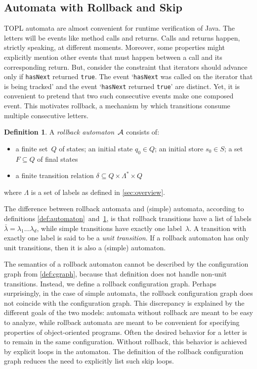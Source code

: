 \documentclass[9pt, preprint]{sigplanconf} %
\theoremstyle{definition}
\newtheorem{definition}{Definition}
\theoremstyle{remark}
\begin{document}
\subsection{Automata with Rollback and Skip} %

TOPL automata are almost convenient for runtime verification of Java.
The letters will be events like method calls and returns.
Calls and returns happen, strictly speaking, at different moments.
Moreover, some properties might explicitly mention other events that must happen between a call and its corresponding return.
But, consider the constraint that iterators should advance only if {\tt hasNext} returned {\tt true}.
The event `{\tt hasNext} was called on the iterator that is being tracked' and the event `{\tt hasNext} returned {\tt true}' are distinct.
Yet, it is convenient to pretend that two such consecutive events make one composed event.
This motivates rollback, a mechanism by which transitions consume multiple consecutive letters.

\begin{definition}\label{def:rollback}
A \emph{rollback automaton}~${\cal A}$ consists of:
\begin{itemize}
\item a finite set~$Q$ of states; an initial state $q_0\in Q$; an initial store $s_0\in S$; a set $F\subseteq Q$ of final states
\item a finite transition relation $\delta\subseteq Q\times\Lambda^*\times Q$
\end{itemize}
where $\Lambda$ is a set of labels as defined in \autoref{sec:overview}.
\end{definition}

The difference between rollback automata and (simple) automata, according to definitions \ref{def:automaton}~and~\ref{def:rollback}, is that rollback transitions have a list of labels $\bar\lambda=\lambda_1\ldots\lambda_d$, while simple transitions have exactly one label~$\lambda$.
A transition with exactly one label is said to be a \emph{unit transition}.
If a rollback automaton has only unit transitions, then it is also a (simple) automaton.

The semantics of a rollback automaton cannot be described by the configuration graph from \autoref{def:cgraph}, because that definition does not handle non-unit transitions.
Instead, we define a rollback configuration graph.
Perhaps surprisingly, in the case of simple automata, the rollback configuration graph does not coincide with the configuration graph.
This discrepancy is explained by the different goals of the two models: automata without rollback are meant to be easy to analyze, while rollback automata are meant to be convenient for specifying properties of object-oriented programs.
Often the desired behavior for a letter is to remain in the same configuration.
Without rollback, this behavior is achieved by explicit loops in the automaton.
The definition of the rollback configuration graph reduces the need to explicitly list such skip loops.
\end{document}
